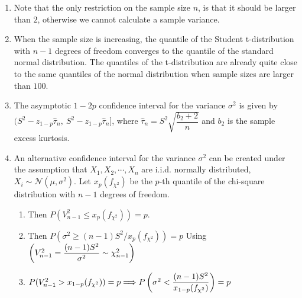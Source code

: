 \begin{enumerate}
    \item Note that the only restriction on the sample size $n$, is that it should be larger than $2$, otherwise we cannot calculate a sample variance.
    \hfill\cite{statistics/book/Statistics-for-Data-Scientists/Maurits-Kaptein}

    \item When the sample size is increasing, the quantile of the Student t-distribution with $n - 1$ degrees of freedom converges to the quantile of the standard normal distribution.
    The quantiles of the t-distribution are already quite close to the same quantiles of the normal distribution when sample sizes are larger than $100$.
    \hfill\cite{statistics/book/Statistics-for-Data-Scientists/Maurits-Kaptein}

    \item The asymptotic $1 - 2 p$ confidence interval for the variance $\sigma^ 2$ is given by $(S^2 - z_{1- p} \hat{\tau}_n ,\ S^2 - z_{1- p} \hat{\tau}_n ]$, where  $\hat{\tau}_n = S^2\sqrt{\dfrac{b_2 + 2}{n}}$ and $b_2$ is the sample excess kurtosis.
    \hfill \cite{statistics/book/Statistics-for-Data-Scientists/Maurits-Kaptein}


    \item An alternative confidence interval for the variance $\sigma ^2$ can be created under the assumption that $X_1 , X_2, \cdots , X _n$ are i.i.d. normally distributed, $X_ i \sim \mathcal{N} (\mu, \sigma^ 2)$.
    Let $x _p ( f_{\chi^2} )$ be the $p$-th quantile of the chi-square distribution with $n - 1$ degrees of freedom.
    \hfill \cite{statistics/book/Statistics-for-Data-Scientists/Maurits-Kaptein}
    \begin{enumerate}
        \item Then $P(V ^2 _{n-1} \leq x _p ( f_{\chi^2} )) = p$.
        \hfill \cite{statistics/book/Statistics-for-Data-Scientists/Maurits-Kaptein}

        \item Then $P(\sigma ^ 2 \geq (n - 1)S^2/x _p ( f_{\chi ^2} )) = p$
        \hfill Using $\left(V ^2 _{n-1} = \dfrac{(n - 1)S^2}{\sigma  ^2} \sim \chi ^2 _{n-1}\right)$
        \hfill \cite{statistics/book/Statistics-for-Data-Scientists/Maurits-Kaptein}

        \item
        $
            P(V^ 2 _{n-1} > x_{1- p} ( f_{\chi^2} )) = p
            \Longrightarrow
            P\left(\sigma ^2 < \dfrac{(n - 1)S^2}{x_{1- p}( f_{\chi^2} )}\right) = p
        $
        \hfill \cite{statistics/book/Statistics-for-Data-Scientists/Maurits-Kaptein}


\end{enumerate}
\end{enumerate}
